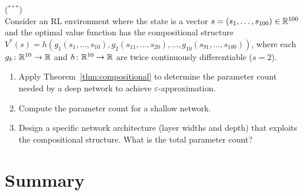 \documentclass[11pt,a4paper]{article}
\begin{document}
\begin{exercise}
\textnormal{(\({}^{***}\))} \\
Consider an RL environment where the state is a vector
$s = (s_1, \ldots, s_{100}) \in \mathbb{R}^{100}$ and the optimal value
function has the compositional structure
$V^*(s) = h(g_1(s_1, \ldots, s_{10}), g_2(s_{11}, \ldots, s_{20}),
\ldots, g_{10}(s_{91}, \ldots, s_{100}))$, where each $g_k \colon
\mathbb{R}^{10} \to \mathbb{R}$ and $h \colon \mathbb{R}^{10} \to \mathbb{R}$ are twice continuously
differentiable ($s = 2$).
\begin{enumerate}[label=(\alph*)]
  \item Apply Theorem~\ref{thm:compositional} to determine the
    parameter count needed by a deep network to achieve
    $\varepsilon$-approximation.
  \item Compute the parameter count for a shallow network.
  \item Design a specific network architecture (layer widths and depth)
    that exploits the compositional structure.  What is the total
    parameter count?
\end{enumerate}
\end{exercise}

\section{Summary}
\label{sec:summary}
\end{document}
